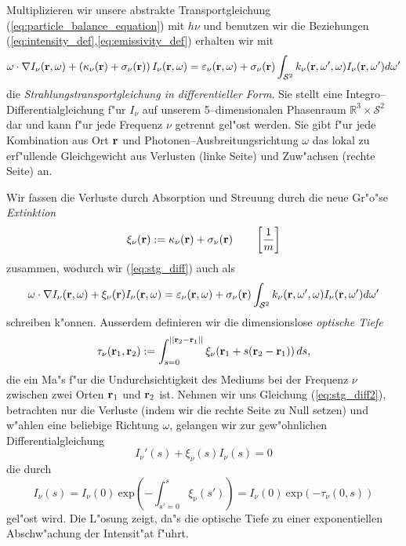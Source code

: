 \documentclass[11pt,a4paper,DIVcalc,BCOR8mm,titlepage,twoside]{scrartcl}
\begin{document}
	Multiplizieren wir unsere abstrakte Transportgleichung (\ref{eq:particle_balance_equation}) mit $h\nu$ und benutzen wir die Beziehungen (\ref{eq:intensity_def},\ref{eq:emissivity_def}) erhalten wir mit
	\begin{equation}\label{eq:stg_diff}
	  \omega\cdot\nabla I_\nu(\mathbf{r},\omega)+\left(\kappa_\nu(\mathbf{r})+\sigma_\nu(\mathbf{r})\right)I_\nu(\mathbf{r},\omega)
	  =\varepsilon_\nu(\mathbf{r},\omega)+\sigma_\nu(\mathbf{r})\int_{\mathcal{S}^2}k_\nu(\mathbf{r},\omega',\omega)I_\nu(\mathbf{r},\omega')d\omega'
	\end{equation}
	die {\em Strahlungstransportgleichung in differentieller Form}. Sie stellt eine Integro--Differentialgleichung f"ur $I_\nu$ auf unserem 5--dimensionalen Phasenraum $\mathbb{R}^3 \times \mathcal{S}^2$ dar und kann f"ur jede Frequenz $\nu$ getrennt gel"ost werden. Sie gibt f"ur jede Kombination aus Ort $\mathbf{r}$ und Photonen--Ausbreitungsrichtung $\omega$ das lokal zu erf"ullende Gleichgewicht aus Verlusten (linke Seite) und Zuw"achsen (rechte Seite) an.
	
	Wir fassen die Verluste durch Absorption und Streuung durch die neue Gr"o"se {\em Extinktion}
	$$\xi_\nu(\mathbf{r}):=\kappa_\nu(\mathbf{r})+\sigma_\nu(\mathbf{r}) \qquad\left[\frac{1}{m}\right]$$
	zusammen, wodurch wir (\ref{eq:stg_diff}) auch als
	\begin{equation}\label{eq:stg_diff2}
	  \omega\cdot\nabla I_\nu(\mathbf{r},\omega)+\xi_\nu(\mathbf{r})I_\nu(\mathbf{r},\omega)
	  =\varepsilon_\nu(\mathbf{r},\omega)+\sigma_\nu(\mathbf{r})\int_{\mathcal{S}^2}k_\nu(\mathbf{r},\omega',\omega)I_\nu(\mathbf{r},\omega')d\omega'
	\end{equation}
	schreiben k"onnen.
	Ausserdem definieren wir die dimensionslose {\em optische Tiefe}
	\begin{equation*}
		\tau_\nu(\mathbf{r}_1,\mathbf{r}_2):=\int_{s=0}^{||\mathbf{r}_2-\mathbf{r}_1||} \xi_\nu(\mathbf{r}_1+s(\mathbf{r}_2 - \mathbf{r}_1))\,ds,
	\end{equation*}
	die ein Ma"s f"ur die Undurchsichtigkeit des Mediums bei der Frequenz $\nu$ zwischen zwei Orten $\mathbf{r}_1$ und $\mathbf{r}_2$ ist. Nehmen wir uns Gleichung (\ref{eq:stg_diff2}), betrachten nur die Verluste (indem wir die rechte Seite zu Null setzen) und w"ahlen eine beliebige Richtung $\omega$, gelangen wir zur gew"ohnlichen Differentialgleichung
	$$I_\nu'(s)+\xi_\nu(s)I_\nu(s)=0$$
	die durch
	$$I_\nu(s)=I_\nu(0)\:\text{exp}\left(-\int_{s'=0}^s \xi_\nu(s')\right)=I_\nu(0)\:\text{exp}\left(-\tau_\nu(0,s)\right)$$
	gel"ost wird. Die L"osung zeigt, da"s die optische Tiefe zu einer exponentiellen Abschw"achung der Intensit"at f"uhrt.
	
\end{document}
